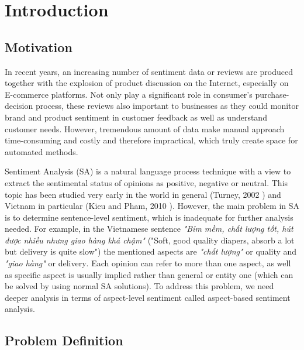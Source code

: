 \chapter{Introduction}
\label{chap:introduction}

\section{Motivation}

In recent years, an increasing number of sentiment data or reviews are produced together with the explosion of product discussion on the Internet, especially on E-commerce platforms. Not only play a significant role in consumer's purchase-decision process, these reviews also important to businesses as they could monitor brand and product sentiment in customer feedback as well as understand customer needs. However, tremendous amount of data make manual approach time-consuming and costly and therefore impractical, which truly create space for automated methods.

Sentiment Analysis (SA) is a natural language process technique with a view to extract the sentimental status of opinions as positive, negative or neutral. This topic has been studied very early in the world in general (Turney, 2002 \cite{turney2002thumbs}) and Vietnam in particular (Kieu and Pham, 2010 \cite{kieu2010sentiment}). However, the main problem in SA is to determine sentence-level sentiment, which is inadequate for further analysis needed. For example, in the Vietnamese sentence \foreignlanguage{vietnamese}{\emph{"Bỉm mềm, chất lượng tốt, hút được nhiều nhưng giao hàng khá chậm"} ("Soft, good quality diapers, absorb a lot but delivery is quite slow") the mentioned aspects are \emph{"chất lượng"} or quality and \emph{"giao hàng"} or delivery}. Each opinion can refer to more than one aspect, as well as specific aspect is usually implied rather than general or entity one (which can be solved by using normal SA solutions). To address this problem, we need deeper analysis in terms of aspect-level sentiment called aspect-based sentiment analysis.


\section{Problem Definition}

